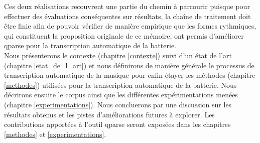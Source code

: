 Ces deux réalisations recouvrent une partie du chemin à parcourir puisque pour
effectuer des évaluations conséquentes sur résultats, la chaîne de traitement
doit être finie afin de pouvoir vérifier de manière empirique que les formes
rythmiques, qui constituent la proposition originale de ce mémoire, ont
permis d’améliorer qparse pour la transcription automatique de la batterie.\\

Nous présenterons le contexte (chapitre \ref{contexte}) suivi d’un état de
l’art (chapitre \ref{etat_de_l_art}) et nous définirons de manière générale le
processus de transcription automatique de la musique pour enfin étayer les
méthodes (chapitre \ref{methodes}) utilisées pour la transcription automatique
de la batterie.  Nous décrirons ensuite le corpus ainsi que les différentes
expérimentations menées (chapitre \ref{experimentations}). Nous concluerons par
une discussion sur les résultats obtenus et les pistes d’améliorations futures
à explorer. Les contributions apportées à l’outil qparse seront exposées dans
les chapitres \ref{methodes} et \ref{experimentations}.
